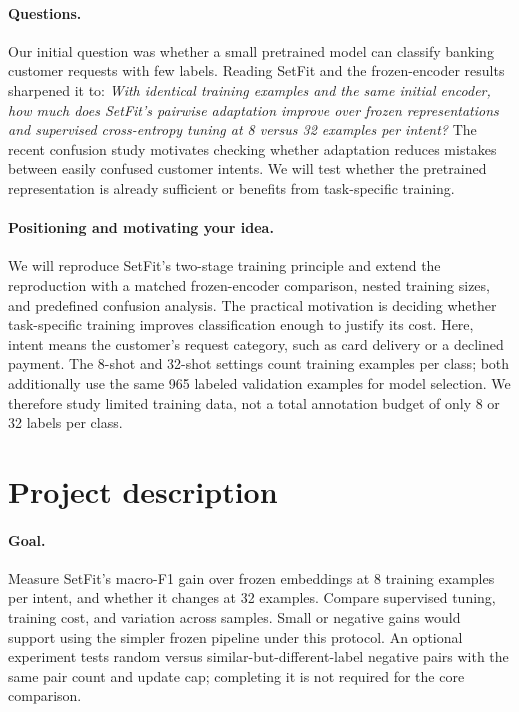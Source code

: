 \documentclass{article}
\begin{document}
\paragraph{Questions.}
Our initial question was whether a small pretrained model can classify banking customer requests with few labels. Reading SetFit and the frozen-encoder results sharpened it to: \emph{With identical training examples and the same initial encoder, how much does SetFit's pairwise adaptation improve over frozen representations and supervised cross-entropy tuning at 8 versus 32 examples per intent?} The recent confusion study motivates checking whether adaptation reduces mistakes between easily confused customer intents. We will test whether the pretrained representation is already sufficient or benefits from task-specific training.

\paragraph{Positioning and motivating your idea.}
We will reproduce SetFit's two-stage training principle and extend the reproduction with a matched frozen-encoder comparison, nested training sizes, and predefined confusion analysis. The practical motivation is deciding whether task-specific training improves classification enough to justify its cost. Here, intent means the customer's request category, such as card delivery or a declined payment. The 8-shot and 32-shot settings count training examples per class; both additionally use the same 965 labeled validation examples for model selection. We therefore study limited training data, not a total annotation budget of only 8 or 32 labels per class.

\newpage
\section{Project description}
\label{sec:description}

\paragraph{Goal.}
Measure SetFit's macro-F1 gain over frozen embeddings at 8 training examples per intent, and whether it changes at 32 examples. Compare supervised tuning, training cost, and variation across samples. Small or negative gains would support using the simpler frozen pipeline under this protocol. An optional experiment tests random versus similar-but-different-label negative pairs with the same pair count and update cap; completing it is not required for the core comparison.
\end{document}
